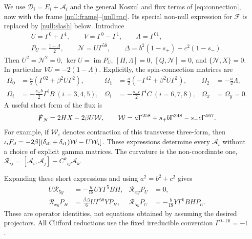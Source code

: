 We use $\mathscr D_i=E_i+\mathcal A_i$ and the general Koszul and flux terms of \eqref{eq:connection}, now with the frame \eqref{null:frame}--\eqref{null:mc}. Its special non-null expression for $\mathcal F$ is replaced by \eqref{null:slash} below. Introduce
\begin{equation}\label{null:operators}
\begin{gathered}
 U=\Gamma^0+\Gamma^1,\qquad V=\Gamma^0-\Gamma^1,\qquad
 \Lambda=\Gamma^{01},\\
 P_U=\frac{1+\Lambda}{2},\qquad \mathcal N=U\Gamma^{58},\qquad
 \Delta=b^2(1-s_+)+c^2(1-s_-).
\end{gathered}
\end{equation}
Then $U^2=\mathcal N^2=0$, $\ker U=\operatorname{im}P_U$, $[H,\Lambda]=0$, $[Q,\mathcal N]=0$, and $\{\mathcal N,X\}=0$. In particular $VU=-2(1-\Lambda)$. Explicitly, the spin-connection matrices are
\begin{align}
 \Omega_0&=\frac a2(\Gamma^{02}+\beta^2U\Gamma^2),&
 \Omega_1&=\frac a2(-\Gamma^{12}+\beta^2U\Gamma^2),&
 \Omega_2&=-\frac a2\Lambda,\nonumber\\
 \Omega_i&=-\frac{s_+b}{2}\Gamma^iB\ (i=3,4,5),&
 \Omega_i&=-\frac{s_-c}{2}\Gamma^iC\ (i=6,7,8),&
 \Omega_x&=\Omega_y=0.\label{null:spinconnection}
\end{align}
A useful short form of the flux is
\begin{equation}\label{null:slash}
 \slashed F_N=2HX-2\beta U\mathcal W,\qquad
 \mathcal W=a\Gamma^{258}+s_+b\Gamma^{348}-s_-c\Gamma^{567}.
\end{equation}
For example, if $\mathcal W_i$ denotes contraction of this transverse three-form, then
$\slashed{\iota_iF_d}=-2\beta[(\delta_{i0}+\delta_{i1})\mathcal W-U\mathcal W_i]$.
These expressions determine every $\mathcal A_i$ without a choice of explicit gamma matrices. The curvature is the non-coordinate one,
$\mathcal R_{ij}=[\mathcal A_i,\mathcal A_j]-C^k{}_{ij}\mathcal A_k$.

Expanding these short expressions and using $a^2=b^2+c^2$ gives
\begin{align}
 U\mathcal R_{5y}&=-\frac b{18}UY\Gamma^5BH,&
 \mathcal R_{xy}P_U&=0,\nonumber\\
 \mathcal R_{xy}P_H&=\frac{\beta\Delta}{6}U\Gamma^{58}YP_H,&
 \mathcal R_{5y}P_U&=-\frac b{18}Y\Gamma^5BH P_U.\label{null:universal-curvature}
\end{align}
These are operator identities, not equations obtained by assuming the desired projectors. All Clifford reductions use the fixed irreducible convention $\Gamma^{0\cdots10}=-1$.

